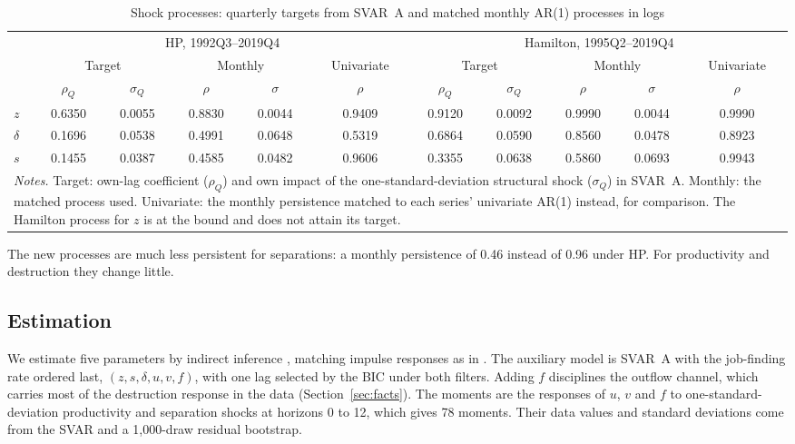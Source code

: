 \documentclass[authoryear, review, 12pt]{elsarticle}
\begin{document}
\begin{table}[H]
\centering
\caption{Shock processes: quarterly targets from SVAR~A and matched monthly AR(1) processes in logs}\label{tab:shocks}
\small
\setlength{\tabcolsep}{4pt}
\begin{tabular}{lccccc@{\hspace{0.5cm}}ccccc}
\toprule
 & \multicolumn{5}{c}{HP, 1992Q3--2019Q4} & \multicolumn{5}{c}{Hamilton, 1995Q2--2019Q4} \\
 & \multicolumn{2}{c}{Target} & \multicolumn{2}{c}{Monthly} & Univariate & \multicolumn{2}{c}{Target} & \multicolumn{2}{c}{Monthly} & Univariate \\
 & $\rho_Q$ & $\sigma_Q$ & $\rho$ & $\sigma$ & $\rho$ & $\rho_Q$ & $\sigma_Q$ & $\rho$ & $\sigma$ & $\rho$ \\
\midrule
$z$ & 0.6350 & 0.0055 & 0.8830 & 0.0044 & 0.9409 & 0.9120 & 0.0092 & 0.9990 & 0.0044 & 0.9990 \\
$\delta$ & 0.1696 & 0.0538 & 0.4991 & 0.0648 & 0.5319 & 0.6864 & 0.0590 & 0.8560 & 0.0478 & 0.8923 \\
$s$ & 0.1455 & 0.0387 & 0.4585 & 0.0482 & 0.9606 & 0.3355 & 0.0638 & 0.5860 & 0.0693 & 0.9943 \\
\bottomrule
\multicolumn{11}{p{0.95\linewidth}}{\footnotesize \textit{Notes.} Target: own-lag coefficient ($\rho_Q$) and own impact of the one-standard-deviation structural shock ($\sigma_Q$) in SVAR~A. Monthly: the matched process used. Univariate: the monthly persistence matched to each series' univariate AR(1) instead, for comparison. The Hamilton process for $z$ is at the bound and does not attain its target.}
\end{tabular}
\end{table}

The new processes are much less persistent for separations: a monthly persistence of 0.46 instead of 0.96 under HP. For productivity and destruction they change little.

\subsection{Estimation}\label{sec:estimation}

We estimate five parameters by indirect inference \citep{gourieroux_1993}, matching impulse responses as in \citet{christiano_2005}. The auxiliary model is SVAR~A with the job-finding rate ordered last, $(z,s,\delta,u,v,f)$, with one lag selected by the BIC under both filters. Adding $f$ disciplines the outflow channel, which carries most of the destruction response in the data (Section~\ref{sec:facts}). The moments are the responses of $u$, $v$ and $f$ to one-standard-deviation productivity and separation shocks at horizons 0 to 12, which gives 78 moments. Their data values and standard deviations come from the SVAR and a 1,000-draw residual bootstrap.
\end{document}

